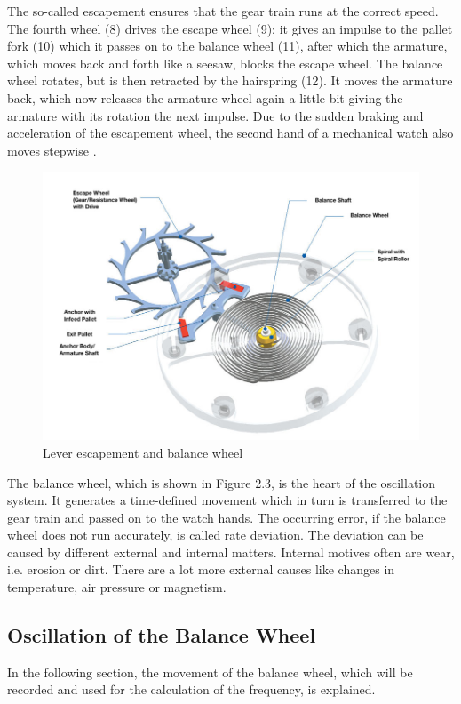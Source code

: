 \documentclass[12pt, a4paper]{report}
\begin{document}
The so-called escapement ensures that the gear train runs at the correct speed. The fourth wheel (8) drives the escape wheel (9); it gives an impulse to the pallet fork (10) which it passes on to the balance wheel (11), after which the armature, which moves back and forth like a seesaw, blocks the escape wheel. The balance wheel rotates, but is then retracted by the hairspring (12). It moves the armature back, which now releases the armature wheel again a little bit giving the armature with its rotation the next impulse. Due to the sudden braking and acceleration of the escapement wheel, the second hand of a mechanical watch also moves stepwise \cite{Uhrwerk}.
    \newline
    \noindent
    \begin{figure}[H]
    \centering
    \includegraphics[scale=0.45]{Images/Hemmung-Teil1.jpg}
    
    \caption{Lever escapement and balance wheel \cite{Uhrwerk}}
    \end{figure}
\bigskip
The balance wheel, which is shown in Figure 2.3, is the heart of the oscillation system. It generates a time-defined movement which in turn is transferred to the gear train and passed on to the watch hands. 
The occurring error, if the balance wheel does not run accurately, is called rate deviation. The deviation can be caused by different external and internal matters. Internal motives often are wear, i.e. erosion or dirt. There are a lot more external causes like changes in temperature, air pressure or magnetism.

\subsection{Oscillation of the Balance Wheel}
In the following section, the movement of the balance wheel, which will be recorded and used for the calculation of the frequency, is explained.
\end{document}
